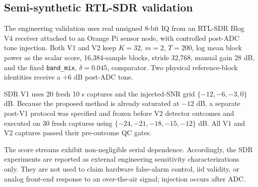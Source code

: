 \subsection{Semi-synthetic RTL-SDR validation}

The engineering validation uses real unsigned 8-bit IQ from an RTL-SDR Blog V4 receiver attached to an Orange Pi sensor node, with controlled post-ADC tone injection. Both V1 and V2 keep \(K=32\), \(m=2\), \(T=200\), log mean block power as the scalar score, 16,384-sample blocks, stride 32,768, manual gain 28 dB, and the fixed \texttt{band\_mix}, \(\delta=0.045\), comparator. Two physical reference-block identities receive a \(+6\) dB post-ADC tone.

SDR V1 uses 20 fresh 10 s captures and the injected-SNR grid \(\{-12,-6,-3,0\}\) dB. Because the proposed method is already saturated at \(-12\) dB, a separate post-V1 protocol was specified and frozen before V2 detector outcomes and executed on 30 fresh captures using \(\{-24,-21,-18,-15,-12\}\) dB. All V1 and V2 captures passed their pre-outcome QC gates.

The score streams exhibit non-negligible serial dependence. Accordingly, the SDR experiments are reported as external engineering sensitivity characterizations only. They are not used to claim hardware false-alarm control, iid validity, or analog front-end response to an over-the-air signal; injection occurs after ADC.
